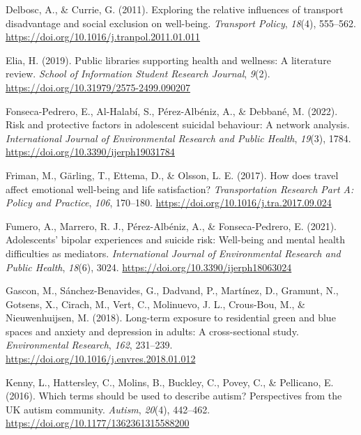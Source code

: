 \documentclass[
  letterpaper,
  number,
  review,
  3p]{elsarticle}
\newlength{\cslhangindent}
\newenvironment{CSLReferences}[2] %
 {\begin{list}{}{%
  \setlength{\itemindent}{0pt}
  \setlength{\leftmargin}{0pt}
  \setlength{\parsep}{0pt}
  \ifodd #1
   \setlength{\leftmargin}{\cslhangindent}
   \setlength{\itemindent}{-1\cslhangindent}
  \fi
  \setlength{\itemsep}{#2\baselineskip}}}
 {\end{list}}
\begin{document}
\begin{CSLReferences}{1}{0}
Delbosc, A., \& Currie, G. (2011). Exploring the relative influences of
transport disadvantage and social exclusion on well-being.
\emph{Transport Policy}, \emph{18}(4), 555--562.
\url{https://doi.org/10.1016/j.tranpol.2011.01.011}

Elia, H. (2019). Public libraries supporting health and wellness: {A}
literature review. \emph{School of Information Student Research
Journal}, \emph{9}(2). \url{https://doi.org/10.31979/2575-2499.090207}

Fonseca-Pedrero, E., Al-Halabí, S., Pérez-Albéniz, A., \& Debbané, M.
(2022). Risk and protective factors in adolescent suicidal behaviour:
{A} network analysis. \emph{International Journal of Environmental
Research and Public Health}, \emph{19}(3), 1784.
\url{https://doi.org/10.3390/ijerph19031784}

Friman, M., Gärling, T., Ettema, D., \& Olsson, L. E. (2017). How does
travel affect emotional well-being and life satisfaction?
\emph{Transportation Research Part A: Policy and Practice}, \emph{106},
170--180. \url{https://doi.org/10.1016/j.tra.2017.09.024}

Fumero, A., Marrero, R. J., Pérez-Albéniz, A., \& Fonseca-Pedrero, E.
(2021). Adolescents' bipolar experiences and suicide risk: {Well-being}
and mental health difficulties as mediators. \emph{International Journal
of Environmental Research and Public Health}, \emph{18}(6), 3024.
\url{https://doi.org/10.3390/ijerph18063024}

Gascon, M., Sánchez-Benavides, G., Dadvand, P., Martínez, D., Gramunt,
N., Gotsens, X., Cirach, M., Vert, C., Molinuevo, J. L., Crous-Bou, M.,
\& Nieuwenhuijsen, M. (2018). Long-term exposure to residential green
and blue spaces and anxiety and depression in adults: {A}
cross-sectional study. \emph{Environmental Research}, \emph{162},
231--239. \url{https://doi.org/10.1016/j.envres.2018.01.012}

Kenny, L., Hattersley, C., Molins, B., Buckley, C., Povey, C., \&
Pellicano, E. (2016). Which terms should be used to describe autism?
{Perspectives} from the {UK} autism community. \emph{Autism},
\emph{20}(4), 442--462. \url{https://doi.org/10.1177/1362361315588200}


\end{CSLReferences}
\end{document}
